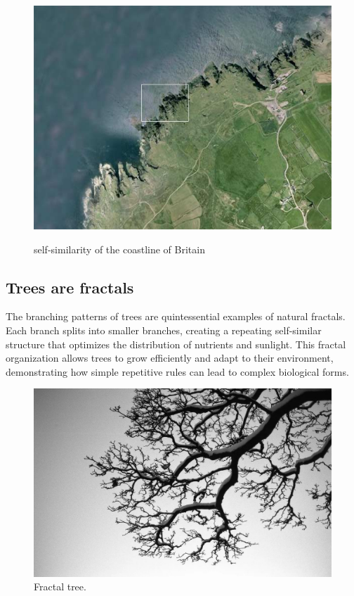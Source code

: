 \documentclass[12pt]{article}
\begin{document}
\begin{figure}[H]
    \begin{minipage}[b]{0.5\textwidth}
        \centering
        \includegraphics[width=\textwidth]{assets/uk4.jpg}
        \label{fig:uk4}
    \end{minipage}
        \caption{self-similarity of the coastline of Britain}
\end{figure}

\subsection{Trees are fractals}
The branching patterns of trees are quintessential examples of natural fractals. Each branch splits into smaller branches, creating a repeating self-similar structure that optimizes the distribution of nutrients and sunlight. This fractal organization allows trees to grow efficiently and adapt to their environment, demonstrating how simple repetitive rules can lead to complex biological forms.

\begin{figure}[H]
\centering
\includegraphics[width=\textwidth]{assets/fractal-tree.jpg}
\caption{Fractal tree.}
\label{fig:fractal-tree}
\end{figure}
\end{document}
